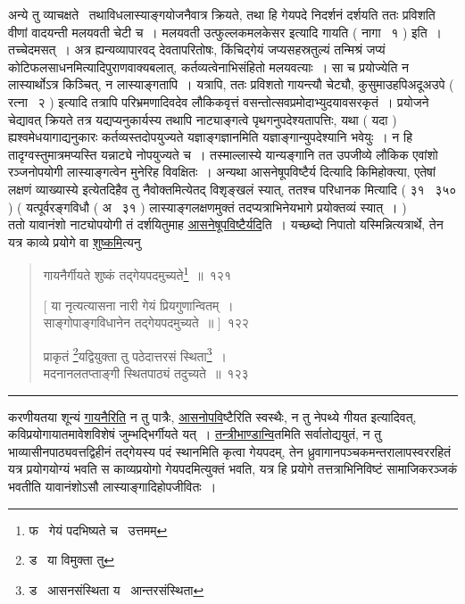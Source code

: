 \documentclass[11pt, openany]{book}
\begin{document}
अन्ये तु व्याचक्षते \textendash\ तथाविधलास्याङ्गयोजनैवात्र क्रियते, तथा हि गेयपदे निदर्शनं दर्शयति ततः प्रविशति वीणां वादयन्ती मलयवती चेटी च~। मलयवती {\qt उत्फुल्लकमलकेसर} इत्यादि गायति ( नागा \textendash\ १ ) इति~। तच्चेदमसत्~। अत्र ह्यन्यव्यापारवद् देवतापरितोषः, किंचिद्गेयं जप्यसहस्रतुल्यं तन्मिश्रं जप्यं कोटिफलसाधनमित्यादिपुराणवाक्यबलात्, कर्तव्यत्वेनाभिसंहितो मलयवत्याः~। {\qt सा च प्रयोज्ये}ति न लास्यार्थोऽत्र किञ्चित्, न लास्याङ्गतापि~। यत्रापि, ततः प्रविशतो गायन्त्यौ चेट्यौ, कुसुमाउहपिअदूअउपे ( रत्ना \textendash\ २ ) इत्यादि तत्रापि परिभ्रमणादिवदेव लौकिकवृत्तं वसन्तोत्सवप्रमोदाभ्युदयावसरकृतं~। प्रयोजने चेद्यावत् क्रियते तत्र यद्यप्यनुकार्यस्य तथापि नाट्याङ्गत्वे पृथगनुपदेश्यतापत्तिः, यथा ( यदा ) ह्यश्वमेधयागाद्यनुकारः कर्तव्यस्तदोपयुज्यते यज्ञाङ्गज्ञानमिति यज्ञाङ्गान्युपदेश्यानि भवेयुः~। न हि तादृग्वस्तुमात्रमप्यस्ति यन्नाट्ये नोपयुज्यते च~। तस्माल्लास्ये यान्यङ्गानि तत उपजीव्ये लौकिक एवांशो रञ्जनोपयोगी लास्याङ्गत्वेन मुनेरिह विवक्षितः~। अन्यथा {\qt आसनेषूपविष्टैर्य} दित्यादि किमिहोक्त्या, {\qt एतेषां लक्षणं व्याख्यास्ये} इत्येतदिहैव तु नैवोक्तमित्येतद् विशृङ्खलं स्यात्, {\qt ततश्च परिधानक} मित्यादि ( ३१ \textendash\ ३५० ) ( यत्पूर्वरङ्गविधौ ( अ \textendash\ ३१ ) लास्याङ्गलक्षणमुक्तं तदप्यत्राभिनेयभागे प्रयोक्तव्यं स्यात्~। )\\

ततो यावानंशो नाट्योपयोगी तं दर्शयितुमाह \underline{आसनेषूपविष्टैर्यदि}ति~। यच्छब्दो निपातो यस्मिन्नित्यत्रार्थे, तेन यत्र काव्ये प्रयोगे वा \underline{शुष्कमि}त्यनु \textendash

\newpage

\begin{quote}
{\na गायनैर्गीयते शुष्कं तद्गेयपदमुच्यते\renewcommand{\thefootnote}{1}\footnote{फ \textendash\ गेयं पदभिष्यते च \textendash\ उत्तमम्}~॥~१२१

[ या नृत्यत्यासना नारी गेयं प्रियगुणान्वितम्~।\\
साङ्गोपाङ्गविधानेन तद्गेयपदमुच्यते~॥ ]~१२२

प्राकृतं \renewcommand{\thefootnote}{2}\footnote{ड \textendash\ या विमुक्ता तु}यद्वियुक्ता तु पठेदात्तरसं स्थिता\renewcommand{\thefootnote}{3}\footnote{ड \textendash\ आसनसंस्थिता य \textendash\ आन्तरसंस्थिता}~।\\
मदनानलतप्ताङ्गी स्थितपाठ्यं तदुच्यते~॥~१२३}
\end{quote}

\hrule

\vspace{2mm}
\noindent
करणीयतया शून्यं \underline{गायनैरिति} न तु पात्रैः, \underline{आसनोपवि}ष्टैरिति स्वस्थैः, न तु नेपथ्ये गीयत इत्यादिवत्, कविप्रयोगायातमावेशविशेषं जुम्भद्भिर्गीयते यत्~। \underline{तन्त्रीभाण्डान्वि}तमिति सर्वातोद्ययुतं, न तु भाव्यासीनपाठ्यवत्तद्विहीनं तद्गेयस्य पदं स्थानमिति कृत्वा गेयपदम्, तेन ध्रुवागानपञ्चकमन्तरालापस्वररहितं यत्र प्रयोगयोग्यं भवति स काव्यप्रयोगो गेयपदमित्युक्तं भवति, यत्र हि प्रयोगे तत्तत्राभिनिविष्टं सामाजिकरञ्जकं भवतीति यावानंशोऽसौ लास्याङ्गादिहोपजीवितः~।\\
\end{document}
